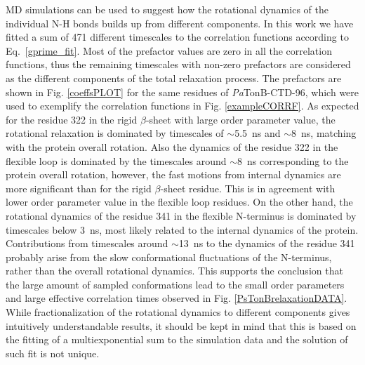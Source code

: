 \documentclass[journal=jpcbfk,manuscript=article]{achemso}
\begin{document}
MD simulations can be used to suggest how the rotational dynamics of the individual N-H bonds
builds up from different components. In this work we have fitted a sum of 471 different
timescales to the correlation functions according to Eq.~\ref{gprime_fit}.
Most of the prefactor values are zero in all the correlation functions,
thus the remaining timescales with non-zero prefactors are considered as the different
components of the total relaxation process.
The prefactors are shown in Fig. \ref{coeffsPLOT} for the same residues
of {\it Pa}TonB-CTD-96, which were used to exemplify the correlation functions in Fig. \ref{exampleCORRF}.
As expected for the residue 322 in the rigid $\beta$-sheet with large order parameter value,
the rotational relaxation is dominated by timescales of $\sim$5.5~ns and $\sim$8~ns,
matching with the protein overall
rotation. Also the dynamics of the residue 322 in the flexible loop is
dominated by the timescales around $\sim$8~ns corresponding to the protein overall rotation,
however, the fast motions from internal dynamics are more significant than for the
rigid $\beta$-sheet residue. This is in agreement with lower order parameter value
in the flexible loop residues. On the other hand, the rotational dynamics of
the residue 341 in the flexible N-terminus is dominated by timescales
below 3~ns, most likely related to the internal dynamics of the protein.
Contributions from timescales around $\sim$13~ns to the dynamics of the residue 341 probably
arise from the slow conformational fluctuations of the N-terminus, rather than the overall
rotational dynamics. This supports the conclusion that the large amount of sampled
conformations lead to the small order parameters and large effective correlation times
observed in Fig. \ref{PsTonBrelaxationDATA}.
While fractionalization of the rotational dynamics to different components
gives intuitively understandable results, it should be kept in mind that
this is based on the fitting of a multiexponential sum to the simulation data and the solution
of such fit is not unique.
\end{document}
